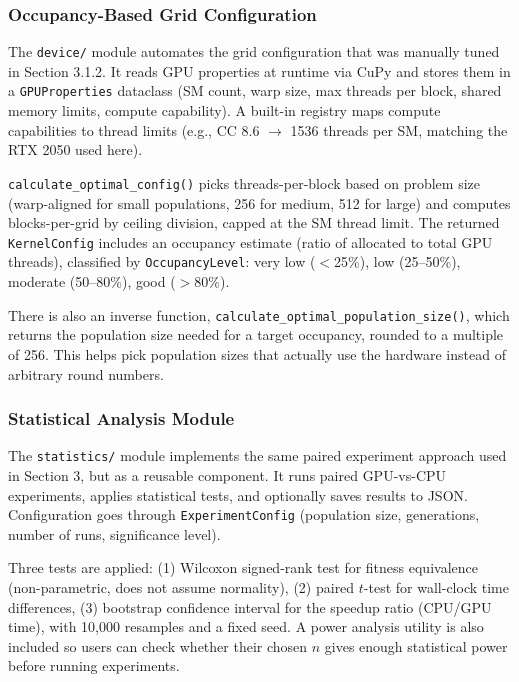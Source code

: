 \subsubsection*{Occupancy-Based Grid Configuration}

The \texttt{device/} module automates the grid configuration that was manually tuned in Section 3.1.2. It reads GPU properties at runtime via CuPy and stores them in a \texttt{GPUProperties} dataclass (SM count, warp size, max threads per block, shared memory limits, compute capability). A built-in registry maps compute capabilities to thread limits (e.g., CC 8.6 $\to$ 1536 threads per SM, matching the RTX 2050 used here).

\texttt{calculate\_optimal\_config()} picks threads-per-block based on problem size (warp-aligned for small populations, 256 for medium, 512 for large) and computes blocks-per-grid by ceiling division, capped at the SM thread limit. The returned \texttt{KernelConfig} includes an occupancy estimate (ratio of allocated to total GPU threads), classified by \texttt{OccupancyLevel}: very low ($<$25\%), low (25--50\%), moderate (50--80\%), good ($>$80\%).

There is also an inverse function, \texttt{calculate\_optimal\_\allowbreak{}population\_size()}, which returns the population size needed for a target occupancy, rounded to a multiple of 256. This helps pick population sizes that actually use the hardware instead of arbitrary round numbers.

\subsubsection*{Statistical Analysis Module}

The \texttt{statistics/} module implements the same paired experiment approach used in Section 3, but as a reusable component. It runs paired GPU-vs-CPU experiments, applies statistical tests, and optionally saves results to JSON. Configuration goes through \texttt{ExperimentConfig} (population size, generations, number of runs, significance level).

Three tests are applied:
(1) Wilcoxon signed-rank test for fitness equivalence (non-parametric, does not assume normality),
(2) paired $t$-test for wall-clock time differences,
(3) bootstrap confidence interval for the speedup ratio (CPU/GPU time), with 10{,}000 resamples and a fixed seed.
A power analysis utility is also included so users can check whether their chosen $n$ gives enough statistical power before running experiments.

